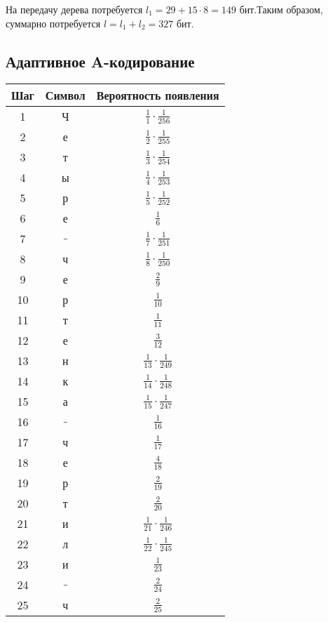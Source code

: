 На передачу дерева потребуется $l_1 = 29 + 15 \cdot 8 = 149$ бит.Таким образом, суммарно потребуется $l = l_1 + l_2 = 327$ бит.

\subsection{Адаптивное A-кодирование}

\begin{tabular}{|c|c|c|}
\hline
Шаг & Символ & Вероятность появления\\
\hline
1 & Ч & $\frac{1}{1} \cdot \frac{1}{256}$\\
\hline
2 & е & $\frac{1}{2} \cdot \frac{1}{255}$\\
\hline
3 & т & $\frac{1}{3} \cdot \frac{1}{254}$\\
\hline
4 & ы & $\frac{1}{4} \cdot \frac{1}{253}$\\
\hline
5 & р & $\frac{1}{5} \cdot \frac{1}{252}$\\
\hline
6 & е & $\frac{1}{6}$\\
\hline
7 & $\_$ & $\frac{1}{7} \cdot \frac{1}{251}$\\
\hline
8 & ч & $\frac{1}{8} \cdot \frac{1}{250}$\\
\hline
9 & е & $\frac{2}{9}$\\
\hline
10 & р & $\frac{1}{10}$\\
\hline
11 & т & $\frac{1}{11}$\\
\hline
12 & е & $\frac{3}{12}$\\
\hline
13 & н & $\frac{1}{13} \cdot \frac{1}{249}$\\
\hline
14 & к & $\frac{1}{14} \cdot \frac{1}{248}$\\
\hline
15 & а & $\frac{1}{15} \cdot \frac{1}{247}$\\
\hline
16 & $\_$ & $\frac{1}{16}$\\
\hline
17 & ч & $\frac{1}{17}$\\
\hline
18 & е & $\frac{4}{18}$\\
\hline
19 & р & $\frac{2}{19}$\\
\hline
20 & т & $\frac{2}{20}$\\
\hline
21 & и & $\frac{1}{21} \cdot \frac{1}{246}$\\
\hline
22 & л & $\frac{1}{22} \cdot \frac{1}{245}$\\
\hline
23 & и & $\frac{1}{23}$\\
\hline
24 & $\_$ & $\frac{2}{24}$\\
\hline
25 & ч & $\frac{2}{25}$\\

\end{tabular}
